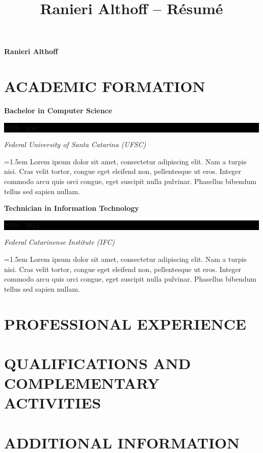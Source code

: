 \documentclass[10pt]{article}
\newcommand{\sectiontitle}[1]{\section*{\uppercase{#1}}}
\newcommand{\formationentry}[4]{
	\noindent \textbf{#1} \hfill
	\colorbox{black}{
		\parbox{8em}{
			\hfill \color{white} #2
		}
	} \par
	\noindent \textit{#3} \par
	\noindent \hangindent=1.5em \hangafter=0 \small #4 \par
	\normalsize
	\vspace{1em}
}
\begin{document}
 \selectfont

\title{Ranieri Althoff -- Résumé}

\Huge \hfill \textbf{Ranieri Althoff}
\normalsize \par

\sectiontitle{Academic Formation}
\formationentry{Bachelor in Computer Science}{2013 - now}{Federal University
of Santa Catarina (UFSC)}{Lorem ipsum dolor sit amet, consectetur adipiscing
elit. Nam a turpis nisi. Cras velit tortor, congue eget eleifend non,
pellentesque ut eros.  Integer commodo arcu quis orci congue, eget suscipit
nulla pulvinar. Phasellus bibendum tellus sed sapien nullam.}

\formationentry{Technician in Information Technology}{2010 - 2012}{Federal
Catarinense Institute (IFC)}{Lorem ipsum dolor sit amet, consectetur adipiscing
elit. Nam a turpis nisi. Cras velit tortor, congue eget eleifend non,
pellentesque ut eros.  Integer commodo arcu quis orci congue, eget suscipit
nulla pulvinar. Phasellus bibendum tellus sed sapien nullam.}


\sectiontitle{Professional Experience}


\sectiontitle{Qualifications and Complementary Activities}


\sectiontitle{Additional Information}
\end{document}
